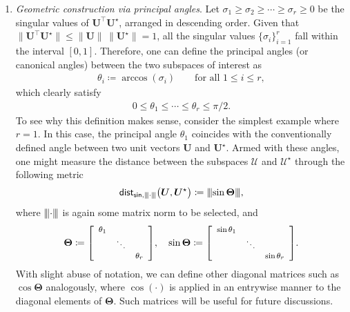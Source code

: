 \begin{enumerate}
\item \emph{Geometric construction via principal angles}. Let $\sigma_{1}\geq \sigma_{2}\geq \cdots\geq \sigma_{r} \geq 0$ be the singular values of $\bm{U}^{\top}{\bm{U}}^{\star}$,
arranged in descending order. Given that $\| \bm{U}^{\top}{\bm{U}}^{\star} \| \leq \| \bm{U} \| \, \| {\bm{U}}^{\star} \|=1 $,
all the singular values
$\{\sigma_{i}\}_{i=1}^r$ fall within the interval $[0,1]$.
Therefore,
one can define the principal angles (or canonical angles) between the two subspaces of interest as
\begin{align}
	\theta_{i} \coloneqq \arccos \left(\sigma_{i}\right)\qquad\text{for all }1\leq i\leq r,
	\label{defn:principal-angles}
\end{align}
%
which clearly satisfy
%
\begin{align}
	0\leq\theta_{1}\leq \cdots\leq\theta_{r}\leq\pi/2.
	\label{eq:principal-angle-range}
\end{align}
%
To see why this definition makes sense, consider the simplest
		example where $r=1$.  In this case, the principal angle $\theta_{1}$ coincides with the conventionally defined angle between two unit vectors $\bm{U}$ and ${\bm{U}}^{\star}$. Armed with these angles, one might measure the distance between the subspaces
$\mathcal{U}$ and ${\mathcal{U}}^{\star}$ through the following metric
%
\begin{equation}
	\mathsf{dist}_{\mathsf{sin},{\left\vert\kern-0.25ex\left\vert\kern-0.25ex\left\vert \cdot \right\vert\kern-0.25ex\right\vert\kern-0.25ex\right\vert}}\big(\bm{U}, {\bm{U}}^{\star} \big) \coloneqq {\left\vert\kern-0.25ex\left\vert\kern-0.25ex\left\vert \sin\bm{\Theta} \right\vert\kern-0.25ex\right\vert\kern-0.25ex\right\vert},\label{eq:geometric-dist}
\end{equation}
%
where ${\left\vert\kern-0.25ex\left\vert\kern-0.25ex\left\vert \cdot \right\vert\kern-0.25ex\right\vert\kern-0.25ex\right\vert}$ is again some matrix norm to be selected, and
%
\begin{equation}
	\bm{\Theta}\coloneqq {\footnotesize \left[\begin{array}{ccc}
\theta_{1}\\
 & \ddots\\
 &  & \theta_{r}
	\end{array}\right] }
	,\quad
	\sin\bm{\Theta}\coloneqq {\footnotesize \left[\begin{array}{ccc}
\sin\theta_{1}\\
 & \ddots\\
 &  & \sin\theta_{r}
	\end{array}\right] } .
	\label{eq:defn-Theta-sin-Theta}
\end{equation}
%
With slight abuse of notation, we can define other diagonal matrices such as $\cos \bm{\Theta}$ analogously, where $\cos(\cdot)$ is applied in an entrywise manner to the diagonal elements of $\bm{\Theta}$. Such matrices will be useful for future discussions.


\end{enumerate}
%

